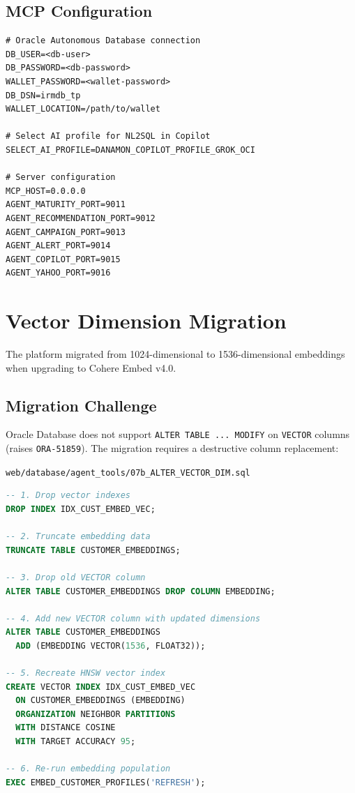 \documentclass[12pt,a4paper]{article}
\begin{document}
\subsection{MCP Configuration}

\begin{lstlisting}[caption={MCP Server .env configuration}]
# Oracle Autonomous Database connection
DB_USER=<db-user>
DB_PASSWORD=<db-password>
WALLET_PASSWORD=<wallet-password>
DB_DSN=irmdb_tp
WALLET_LOCATION=/path/to/wallet

# Select AI profile for NL2SQL in Copilot
SELECT_AI_PROFILE=DANAMON_COPILOT_PROFILE_GROK_OCI

# Server configuration
MCP_HOST=0.0.0.0
AGENT_MATURITY_PORT=9011
AGENT_RECOMMENDATION_PORT=9012
AGENT_CAMPAIGN_PORT=9013
AGENT_ALERT_PORT=9014
AGENT_COPILOT_PORT=9015
AGENT_YAHOO_PORT=9016
\end{lstlisting}

\section{Vector Dimension Migration}
\label{sec:migration}

The platform migrated from 1024-dimensional to 1536-dimensional embeddings when upgrading to Cohere Embed v4.0.

\subsection{Migration Challenge}

Oracle Database does not support \texttt{ALTER TABLE ... MODIFY} on \texttt{VECTOR} columns (raises \texttt{ORA-51859}). The migration requires a destructive column replacement:

\texttt{web/database/agent\_tools/07b\_ALTER\_VECTOR\_DIM.sql}

\begin{lstlisting}[language=SQL, caption={Vector dimension migration procedure}]
-- 1. Drop vector indexes
DROP INDEX IDX_CUST_EMBED_VEC;

-- 2. Truncate embedding data
TRUNCATE TABLE CUSTOMER_EMBEDDINGS;

-- 3. Drop old VECTOR column
ALTER TABLE CUSTOMER_EMBEDDINGS DROP COLUMN EMBEDDING;

-- 4. Add new VECTOR column with updated dimensions
ALTER TABLE CUSTOMER_EMBEDDINGS
  ADD (EMBEDDING VECTOR(1536, FLOAT32));

-- 5. Recreate HNSW vector index
CREATE VECTOR INDEX IDX_CUST_EMBED_VEC
  ON CUSTOMER_EMBEDDINGS (EMBEDDING)
  ORGANIZATION NEIGHBOR PARTITIONS
  WITH DISTANCE COSINE
  WITH TARGET ACCURACY 95;

-- 6. Re-run embedding population
EXEC EMBED_CUSTOMER_PROFILES('REFRESH');
\end{lstlisting}
\end{document}
